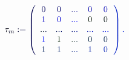 \documentclass[12pt]{article}
\begin{document}
\makeatletter
\renewcommand*{\@textcolor}[3]{%
  \protect\leavevmode
  \begingroup
    \color#1{#2}#3%
  \endgroup
}
\makeatother
\begin{displaymath}
\mathcolor[RGB]{0,0,15}{\tau} _ { \mathcolor[RGB]{0,0,30}{m} } \mathcolor[RGB]{0,0,45}{:} \mathcolor[RGB]{0,0,60}{=} \mathcolor[RGB]{0,0,75}{\left(} \begin{array} {ccccccc} { \mathcolor[RGB]{0,0,90}{0} } & { \mathcolor[RGB]{0,0,105}{0} } & { \mathcolor[RGB]{0,0,120}{.} \mathcolor[RGB]{0,0,135}{.} \mathcolor[RGB]{0,0,150}{.} } & { \mathcolor[RGB]{0,0,165}{0} } & { \mathcolor[RGB]{0,0,180}{0} } \\ { \mathcolor[RGB]{0,0,195}{1} } & { \mathcolor[RGB]{0,0,210}{0} } & { \mathcolor[RGB]{0,0,225}{.} \mathcolor[RGB]{0,0,240}{.} \mathcolor[RGB]{0,0,255}{.} } & { \mathcolor[RGB]{0,15,0}{0} } & { \mathcolor[RGB]{0,15,15}{0} } \\ { \mathcolor[RGB]{0,15,30}{.} \mathcolor[RGB]{0,15,45}{.} \mathcolor[RGB]{0,15,60}{.} } & { \mathcolor[RGB]{0,15,75}{.} \mathcolor[RGB]{0,15,90}{.} \mathcolor[RGB]{0,15,105}{.} } & { \mathcolor[RGB]{0,15,120}{.} \mathcolor[RGB]{0,15,135}{.} \mathcolor[RGB]{0,15,150}{.} } & { \mathcolor[RGB]{0,15,165}{.} \mathcolor[RGB]{0,15,180}{.} \mathcolor[RGB]{0,15,195}{.} } & { \mathcolor[RGB]{0,15,210}{.} \mathcolor[RGB]{0,15,225}{.} \mathcolor[RGB]{0,15,240}{.} } \\ { \mathcolor[RGB]{0,15,255}{1} } & { \mathcolor[RGB]{0,30,0}{1} } & { \mathcolor[RGB]{0,30,15}{.} \mathcolor[RGB]{0,30,30}{.} \mathcolor[RGB]{0,30,45}{.} } & { \mathcolor[RGB]{0,30,60}{0} } & { \mathcolor[RGB]{0,30,75}{0} } \\ { \mathcolor[RGB]{0,30,90}{1} } & { \mathcolor[RGB]{0,30,105}{1} } & { \mathcolor[RGB]{0,30,120}{.} \mathcolor[RGB]{0,30,135}{.} \mathcolor[RGB]{0,30,150}{.} } & { \mathcolor[RGB]{0,30,165}{1} } & { \mathcolor[RGB]{0,30,180}{0} } \end{array} \mathcolor[RGB]{0,30,195}{\right)} \mathcolor[RGB]{0,30,210}{.}
\end{displaymath}
\end{document}
